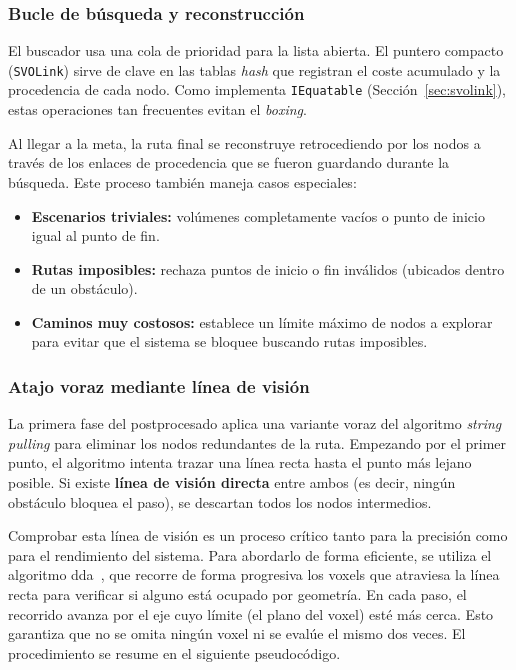 \subsubsection{Bucle de búsqueda y reconstrucción}

El buscador usa una cola de prioridad para la lista abierta.
El puntero compacto (\texttt{SVOLink}) sirve de clave en las tablas \textit{hash} que registran el coste acumulado y la procedencia de cada nodo.
Como implementa \texttt{IEquatable} (Sección~\ref{sec:svolink}), estas operaciones tan frecuentes evitan el \textit{boxing}.

Al llegar a la meta, la ruta final se reconstruye retrocediendo por los nodos a través de los enlaces de procedencia que se fueron guardando durante la búsqueda.
Este proceso también maneja casos especiales:

\begin{itemize}
  \item \textbf{Escenarios triviales:} volúmenes completamente vacíos o punto de inicio igual al punto de fin.
  \item \textbf{Rutas imposibles:} rechaza puntos de inicio o fin inválidos (ubicados dentro de un obstáculo).
  \item \textbf{Caminos muy costosos:} establece un límite máximo de nodos a explorar para evitar que el sistema se bloquee buscando rutas imposibles.
\end{itemize}

\subsubsection{Atajo voraz mediante línea de visión}

La primera fase del postprocesado aplica una variante voraz del algoritmo \textit{string pulling} para eliminar los nodos redundantes de la ruta.
Empezando por el primer punto, el algoritmo intenta trazar una línea recta hasta el punto más lejano posible.
Si existe \textbf{línea de visión directa} entre ambos (es decir, ningún obstáculo bloquea el paso), se descartan todos los nodos intermedios.

Comprobar esta línea de visión es un proceso crítico tanto para la precisión como para el rendimiento del sistema.
Para abordarlo de forma eficiente, se utiliza el algoritmo \acrshort{dda}~\cite{amanatides1987fast}, que recorre de forma progresiva los \glspl{voxel} que atraviesa la línea recta para verificar si alguno está ocupado por geometría.
En cada paso, el recorrido avanza por el eje cuyo límite (el plano del \gls{voxel}) esté más cerca.
Esto garantiza que no se omita ningún \gls{voxel} ni se evalúe el mismo dos veces.
El procedimiento se resume en el siguiente pseudocódigo.

